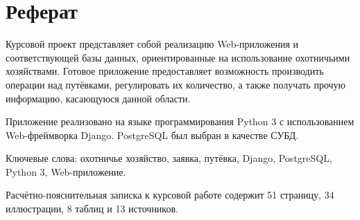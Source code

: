 \section*{Реферат}
Курсовой проект представляет собой реализацию Web-приложения и соответствующей базы данных, ориентированные на использование охотничьими хозяйствами. Готовое приложение предоставляет возможность производить операции над путёвками, регулировать их количество, а также получать прочую информацию, касающуюся данной области.

Приложение реализовано на языке программирования Python 3 с использованием Web-фреймворка Django. PostgreSQL был выбран в качестве СУБД.

Ключевые слова: охотничье хозяйство, заявка, путёвка, Django, PostgreSQL, Python 3, Web-приложение.

Расчётно-пояснительная записка к курсовой работе содержит 51 страницу, 34 иллюстрации, 8 таблиц и 13 источников.